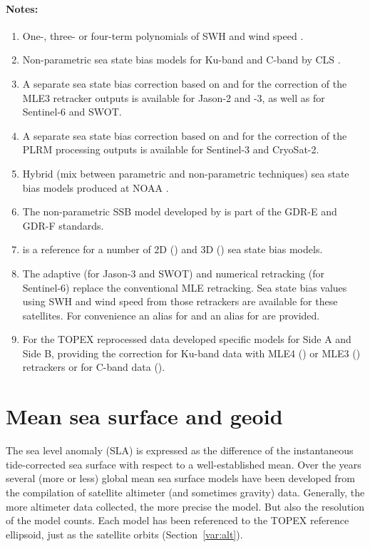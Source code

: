 \documentclass[a4paper,11pt,openany,natbib,nomargin]{thesis}
\newenvironment{notes}[1][Notes:]{\FloatBarrier\paragraph{#1}\begin{enumerate}}{\end{enumerate}}
\begin{document}
\begin{notes}
\item One-, three- or four-term polynomials of SWH and wind speed \citep{gaspar1994a}.\label{item:ssb_bm3}
\item Non-parametric sea state bias models for Ku-band and C-band by CLS \citep{gaspar2002,labroue2004}.\label{item:ssb_cls}\label{item:ssb_cls_c}
\item A separate sea state bias correction based on and for the correction of the MLE3 retracker outputs is available for Jason-2 and -3, as well as for Sentinel-6 and SWOT.\label{item:ssb_cls_mle3}
\item A separate sea state bias correction based on and for the correction of the PLRM processing outputs is available for Sentinel-3 and CryoSat-2.\label{item:ssb_cls_plrm}
\item Hybrid (mix between parametric and non-parametric techniques) sea state bias models produced at NOAA \citep{scharroo2005e}.\label{item:ssb_hyb}
\item The non-parametric SSB model developed by \citet{tran2012} is part of the GDR-E and GDR-F standards.\label{item:ssb_tran2012}
\item \citep{tran2021} is a reference for a number of 2D () and 3D () sea state bias models.\label{item:ssb_tran2019}\label{item:ssb_tran2019_3d}\label{item:ssb_cls_3d}
\item The adaptive (for Jason-3 and SWOT) and numerical retracking (for Sentinel-6) replace the conventional MLE retracking. Sea state bias values using SWH and wind speed from those retrackers are available for these satellites. For convenience an alias  for  and an alias  for  are provided.\label{item:ssb_cls_adaptive}\label{item:ssb_cls_nr}\label{item:ssb_cls_c_adaptive}\label{item:ssb_cls_c_nr}
\item For the TOPEX reprocessed data \citet{putnam2021} developed specific models for Side A and Side B, providing the correction for Ku-band data with MLE4 () or MLE3 () retrackers or for C-band data ().\label{item:ssb_tx}\label{item:ssb_tx_mle3}\label{item:ssb_tx_c}
\end{notes}

\section{Mean sea surface and geoid}
\label{var:geoid}\label{var:mss}
The sea level anomaly (SLA) is expressed as the difference of the instantaneous tide-corrected sea surface with respect to a well-established mean. Over the years several (more or less) global mean sea surface models have been developed from the compilation of satellite altimeter (and sometimes gravity) data. Generally, the more altimeter data collected, the more precise the model. But also the resolution of the model counts. Each model has been referenced to the TOPEX reference ellipsoid, just as the satellite orbits (Section~\ref{var:alt}).
\end{document}
